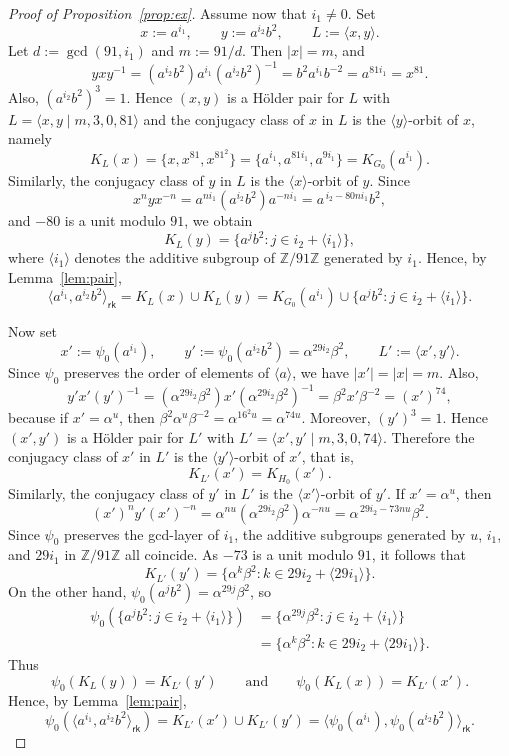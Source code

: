 \documentclass[10pt,a4paper]{amsart}
\begin{document}
\begin{proof}[Proof of Proposition~\ref{prop:ex}]
  Assume now that $i_1\neq 0$. Set
  $$ x:=a^{i_1},\qquad y:=a^{i_2}b^2,\qquad L:=\langle x,y\rangle. $$
  Let $d:=\gcd(91,i_1)$ and $m:=91/d$. Then $|x|=m$, and
  $$ yxy^{-1} = (a^{i_2}b^2)a^{i_1}(a^{i_2}b^2)^{-1} = b^2a^{i_1}b^{-2} = a^{81i_1} = x^{81}. $$
  Also, $(a^{i_2}b^2)^3=1$. Hence $(x,y)$ is a Hölder pair for $L$ with $L=\langle x,y\mid m,3,0,81\rangle$ and the conjugacy class of $x$ in $L$ is the $\langle y\rangle$-orbit of $x$, namely
  $$ K_L(x)=\{x,x^{81},x^{81^2}\}=\{a^{i_1},a^{81i_1},a^{9i_1}\}=K_{G_0}(a^{i_1}). $$
  Similarly, the conjugacy class of $y$ in $L$ is the $\langle x\rangle$-orbit of $y$. Since
  $$ x^n y x^{-n} = a^{ni_1}(a^{i_2}b^2)a^{-ni_1} = a^{\,i_2-80ni_1}b^2, $$
  and $-80$ is a unit modulo $91$, we obtain
  $$ K_L(y)=\{a^j b^2 : j\in i_2+\langle i_1\rangle\}, $$
  where $\langle i_1\rangle$ denotes the additive subgroup of $\mathbb{Z}/91\mathbb{Z}$ generated by $i_1$. Hence, by Lemma~\ref{lem:pair},
  $$ \langle a^{i_1},a^{i_2}b^2\rangle_{\mathsf{rk}} = K_L(x)\cup K_L(y) = K_{G_0}(a^{i_1})\cup \{a^j b^2 : j\in i_2+\langle i_1\rangle\}. $$
  
  Now set
  $$ x':=\psi_0(a^{i_1}),\qquad y':=\psi_0(a^{i_2}b^2)=\alpha^{29i_2}\beta^2,\qquad L':=\langle x',y'\rangle. $$
  Since $\psi_0$ preserves the order of elements of $\langle a\rangle$, we have $|x'|=|x|=m$. Also,
  $$ y'x'(y')^{-1} = (\alpha^{29i_2}\beta^2)x'(\alpha^{29i_2}\beta^2)^{-1} = \beta^2x'\beta^{-2} = (x')^{74}, $$
  because if $x'=\alpha^u$, then $\beta^2\alpha^u\beta^{-2}=\alpha^{16^2u}=\alpha^{74u}$. Moreover, $(y')^3=1$. Hence $(x',y')$ is a Hölder pair for $L'$ with $L' = \langle x',y'\mid m,3,0,74\rangle$. Therefore the conjugacy class of $x'$ in $L'$ is the $\langle y'\rangle$-orbit of $x'$,
  that is,
  $$ K_{L'}(x')=K_{H_0}(x'). $$
  Similarly, the conjugacy class of $y'$ in $L'$ is the $\langle x'\rangle$-orbit of $y'$. If
  $x'=\alpha^u$, then
  $$ (x')^n y' (x')^{-n} = \alpha^{nu}(\alpha^{29i_2}\beta^2)\alpha^{-nu} = \alpha^{\,29i_2-73nu}\beta^2. $$
  Since $\psi_0$ preserves the gcd-layer of $i_1$, the additive subgroups generated by $u$, $i_1$, and $29i_1$ in $\mathbb{Z}/91\mathbb{Z}$ all coincide. As $-73$ is a unit modulo
  $91$, it follows that
  $$ K_{L'}(y')=\{\alpha^k\beta^2 : k\in 29i_2+\langle 29i_1\rangle\}. $$
  On the other hand, $\psi_0(a^j b^2)=\alpha^{29j}\beta^2$, so
  \begin{align*}
    \psi_0(\{a^j b^2:j\in i_2+\langle i_1\rangle\})
    &= \{\alpha^{29j}\beta^2:j\in i_2+\langle i_1\rangle\} \\
    &= \{\alpha^k\beta^2:k\in 29i_2+\langle 29i_1\rangle\}.
  \end{align*}
  Thus
  $$ \psi_0(K_L(y))=K_{L'}(y') \qquad\text{and}\qquad \psi_0(K_L(x))=K_{L'}(x'). $$
  Hence, by Lemma~\ref{lem:pair},
  $$ \psi_0(\langle a^{i_1},a^{i_2}b^2\rangle_{\mathsf{rk}}) = K_{L'}(x')\cup K_{L'}(y') = \langle \psi_0(a^{i_1}),\psi_0(a^{i_2}b^2)\rangle_{\mathsf{rk}}. $$
  

\end{proof}
\end{document}
